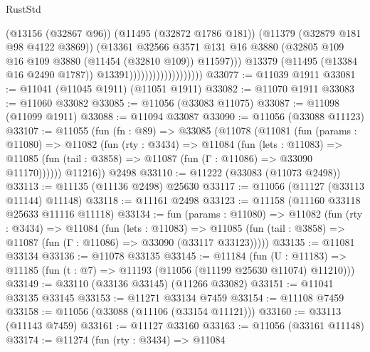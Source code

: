 \begin{lexlean}{RustStd}
\begin{coremodule}
                                            (@13156 (@32867 @96))
                                            (@11495 (@32872 @1786 @181))
                                            (@11379 (@32879 @181 @98 @4122 @3869))
                                            (@13361
                                              @32566
                                              @3571
                                              @131
                                              @16
                                              @3880
                                              (@32805
                                                @109
                                                @16
                                                @109
                                                @3880
                                                (@11454 (@32810 @109))
                                                @11597)))
                                          @13379
                                          (@11495 (@13384 @16 @2490 @1787))
                                          @13391)))))))))))))))))))
@33077 := @11039 @1911
@33081 := @11041 (@11045 @1911) (@11051 @1911)
@33082 := @11070 @1911
@33083 := @11060 @33082
@33085 := @11056 (@33083 @11075)
@33087 := @11098 (@11099 @1911)
@33088 := @11094 @33087
@33090 := @11056 (@33088 @11123)
@33107 := @11055
    (fun (fn : @89) =>
    @33085
      (@11078
        (@11081
          (fun (params : @11080) =>
          @11082
            (fun (rty : @3434) =>
            @11084
              (fun (lets : @11083) =>
              @11085 (fun (tail : @3858) => @11087 (fun (Γ : @11086) => @33090 @11170))))))
        @11216))
    @2498
@33110 := @11222 (@33083 (@11073 @2498))
@33113 := @11135 (@11136 @2498) @25630
@33117 := @11056 (@11127 (@33113 @11144) @11148)
@33118 := @11161 @2498
@33123 := @11158 (@11160 @33118 @25633 @11116 @11118)
@33134 := fun (params : @11080) =>
  @11082
    (fun (rty : @3434) =>
    @11084
      (fun (lets : @11083) =>
      @11085 (fun (tail : @3858) => @11087 (fun (Γ : @11086) => @33090 (@33117 @33123)))))
@33135 := @11081 @33134
@33136 := @11078 @33135
@33145 := @11184
    (fun (U : @11183) => @11185 (fun (t : @7) => @11193 (@11056 (@11199 @25630 @11074) @11210)))
@33149 := @33110 (@33136 @33145) (@11266 @33082)
@33151 := @11041 @33135 @33145
@33153 := @11271 @33134 @7459
@33154 := @11108 @7459
@33158 := @11056 (@33088 (@11106 (@33154 @11121)))
@33160 := @33113 (@11143 @7459)
@33161 := @11127 @33160
@33163 := @11056 (@33161 @11148)
@33174 := @11274
    (fun (rty : @3434) =>
    @11084

\end{coremodule}
\end{lexlean}
